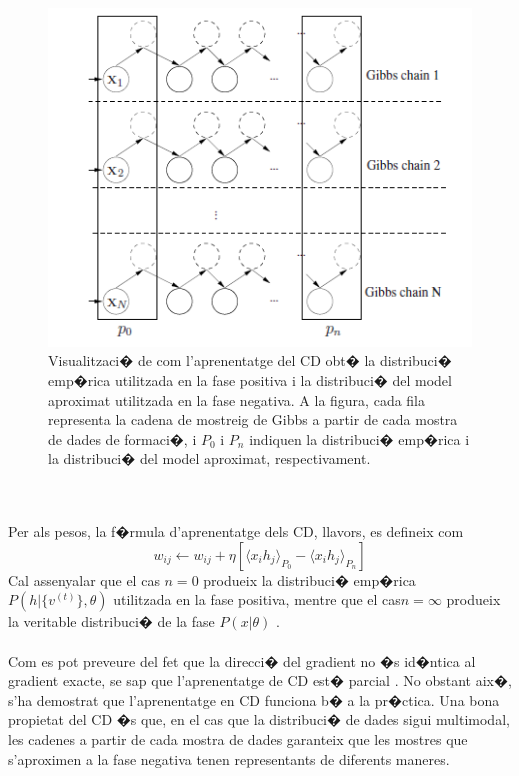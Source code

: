 \documentclass[12pt,a4paper,openright,oneside]{article}
\numberwithin{equation}{section}
\theoremstyle{definition}
\begin{document}
\begin{figure}[h!]
\begin{center}
\includegraphics[width=\textwidth]{cd}
\caption{Visualitzaci� de com l'aprenentatge del CD obt� la distribuci� emp�rica utilitzada en la fase positiva i la distribuci� del model aproximat utilitzada en la fase negativa. A la figura, cada fila representa la cadena de mostreig de Gibbs a partir de cada mostra de dades de formaci�, i ${P_0}$ i ${P_n}$ indiquen la distribuci� emp�rica i la distribuci� del model aproximat, respectivament.}
\end{center}
\end{figure}
\\\\
Per als pesos, la f�rmula d'aprenentatge dels CD, llavors, es defineix com
\begin{equation}
w_{ij}\leftarrow w_{ij} + \eta[\langle x_i h_j\rangle_{P_0} - \langle x_i h_j \rangle_{P_n}]
\end{equation}
Cal assenyalar que el cas ${n = 0}$ produeix la distribuci� emp�rica ${P(h|\{v^{(t)}\},\theta)}$ utilitzada en la fase positiva, mentre que el cas${n = \infty}$ produeix la veritable distribuci� de la fase ${P(x|\theta)}$ \cite{carreira}. \\\\
Com es pot preveure del fet que la direcci� del gradient no �s id�ntica al gradient exacte, se sap que l'aprenentatge de CD est� parcial \cite{carreira}. No obstant aix�, s'ha demostrat que l'aprenentatge en CD funciona b� a la pr�ctica. Una bona propietat del CD �s que, en el cas que la distribuci� de dades sigui multimodal, les cadenes a partir de cada mostra de dades garanteix que les mostres que s'aproximen a la fase negativa tenen representants de diferents maneres.\\\\
\end{document}
